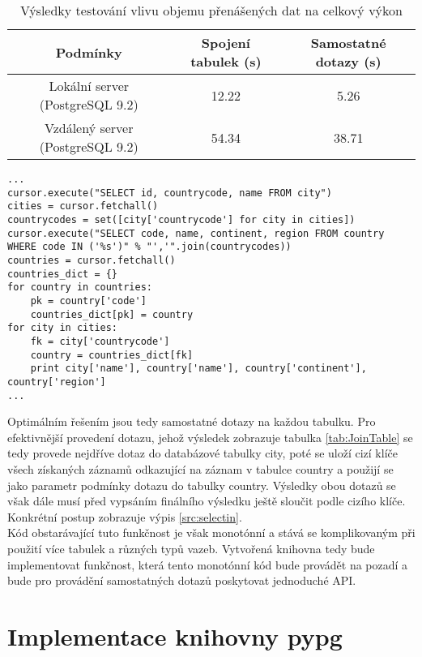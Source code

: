 \documentclass[ing,male,java,dept456]{diploma}						%
\begin{document}
\begin{table}
  \centering
  \begin{tabular}{|c|c|c|}
    \hline
    Podmínky & Spojení tabulek (s) & Samostatné dotazy (s)\\
    \hline
    Lokální server (PostgreSQL 9.2) & 12.22 & 5.26 \\
    \hline
    Vzdálený server (PostgreSQL 9.2) & 54.34 & 38.71 \\
    \hline
  \end{tabular}
  \caption{Výsledky testování vlivu objemu přenášených dat na celkový výkon}
  \label{tab:ProofTable}
\end{table}

\begin{lstlisting}[style=custompython, label=src:selectin, caption={Získávání dat pomocí samostatných dotazů}]
...
cursor.execute("SELECT id, countrycode, name FROM city")
cities = cursor.fetchall()
countrycodes = set([city['countrycode'] for city in cities])
cursor.execute("SELECT code, name, continent, region FROM country WHERE code IN ('%s')" % "','".join(countrycodes))
countries = cursor.fetchall()
countries_dict = {}
for country in countries:
    pk = country['code']
    countries_dict[pk] = country
for city in cities:
    fk = city['countrycode']
    country = countries_dict[fk]
    print city['name'], country['name'], country['continent'], country['region']
...
\end{lstlisting}

Optimálním řešením jsou tedy samostatné dotazy na každou tabulku. Pro efektivnější provedení dotazu, jehož výsledek zobrazuje tabulka \ref{tab:JoinTable} se tedy provede nejdříve dotaz do databázové tabulky city, poté se uloží cizí klíče všech získaných záznamů odkazující na záznam v tabulce country a použijí se jako parametr podmínky dotazu do tabulky country. Výsledky obou dotazů se však dále musí před vypsáním finálního výsledku ještě sloučit podle cizího klíče. Konkrétní postup zobrazuje výpis \ref{src:selectin}. \\
Kód obstarávající tuto funkčnost je však monotónní a stává se komplikovaným při použití více tabulek a různých typů vazeb. Vytvořená knihovna tedy bude implementovat funkčnost, která tento monotónní kód bude provádět na pozadí a bude pro provádění samostatných dotazů poskytovat jednoduché API.

\section{Implementace knihovny pypg}
\end{document}
